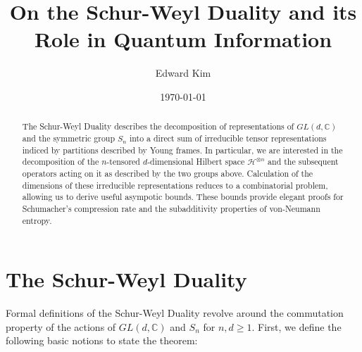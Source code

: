 \documentclass[11pt]{article}%
\begin{document}
\title{On the Schur-Weyl Duality and its Role in Quantum Information}
\author{Edward Kim}
\date{\today}
\maketitle
\begin{abstract}
  The Schur-Weyl Duality describes the decomposition of representations of $GL(d,\mathbb{C})$ and the symmetric group $S_n$ into a direct sum of irreducible tensor representations indiced by partitions described by Young frames. In particular, we are interested in the decomposition of the $n$-tensored $d$-dimensional Hilbert space $\mathcal{H}^{\otimes n}$ and the subsequent operators acting on it as described by the two groups above. Calculation of the dimensions of these irreducible representations reduces to a combinatorial problem, allowing us to derive useful asympotic bounds. These bounds provide elegant proofs for Schumacher's compression rate and the subadditivity properties of von-Neumann entropy.
\end{abstract}

\tableofcontents
\newpage

\section{The Schur-Weyl Duality}
Formal definitions of the Schur-Weyl Duality revolve around the commutation property of the actions of $GL(d,\mathbb{C})$ and $S_n$ for $n,d \geq 1$. First, we define the following basic notions to state the theorem:
\end{document}

